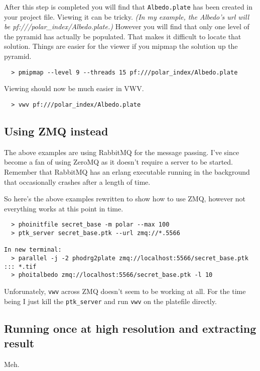 After this step is completed you will find that \texttt{Albedo.plate}
has been created in your project file. Viewing it can be
tricky. \emph{(In my example, the Albedo's url will be
  pf:///polar\_index/Albedo.plate.)} However you will find that only
one level of the pyramid has actually be populated. That makes it
difficult to locate that solution. Things are easier for the viewer if
you mipmap the solution up the pyramid.

\begin{verbatim}
  > pmipmap --level 9 --threads 15 pf:///polar_index/Albedo.plate
\end{verbatim}

Viewing should now be much easier in VWV.

\begin{verbatim}
  > vwv pf:///polar_index/Albedo.plate
\end{verbatim}

\subsection{Using ZMQ instead}

The above examples are using RabbitMQ for the message passing. I've
since become a fan of using ZeroMQ as it doesn't require a server to
be started. Remember that RabbitMQ has an erlang executable running in
the background that occasionally crashes after a length of time.

So here's the above examples rewritten to show how to use ZMQ, however
not everything works at this point in time.

\begin{verbatim}
  > phoinitfile secret_base -m polar --max 100
  > ptk_server secret_base.ptk --url zmq://*.5566

In new terminal:
  > parallel -j -2 phodrg2plate zmq://localhost:5566/secret_base.ptk ::: *.tif
  > phoitalbedo zmq://localhost:5566/secret_base.ptk -l 10
\end{verbatim}

Unforunately, \texttt{vwv} across ZMQ doesn't seem to be working at all. For
the time being I just kill the \texttt{ptk\_server} and run \texttt{vwv} on the
platefile directly.

\subsection{Running once at high resolution and extracting result}

Meh.

